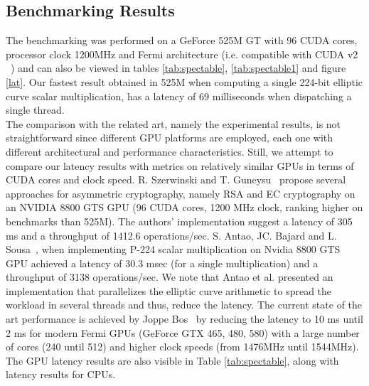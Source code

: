 \documentclass[11pt,twocolumn]{IEEEtran}
\begin{document}
\subsection{Benchmarking Results}\label{bench}
The benchmarking was performed on a GeForce 525M GT with 96 CUDA cores, processor clock 1200MHz and Fermi architecture (i.e. compatible with CUDA v2 ~\cite{cardspecs}) and can also be viewed in tables \ref{tab:spectable}, \ref{tab:spectable1} and figure \ref{lat}. Our fastest result obtained in 525M  when computing a single 224-bit elliptic curve scalar multiplication, has a latency of 69 milliseconds when dispatching a single thread. \\
The comparison with the related art, namely the experimental results, is not straightforward since different GPU platforms are employed, each one with different architectural and performance characteristics. Still, we attempt to compare our latency results with metrics on relatively similar GPUs in terms of CUDA cores and clock speed. R. Szerwinski and T. Guneysu~\cite{iambetterthanthem} propose several approaches for asymmetric cryptography, namely RSA and EC cryptography on an NVIDIA 8800 GTS GPU (96 CUDA cores, 1200 MHz clock, ranking higher on benchmarks than 525M). The authors' implementation suggest a latency of 305 ms and a throughput of 1412.6  operations/sec. S. Antao, JC. Bajard and L. Sousa~\cite{antao}, when implementing P-224 scalar multiplication on Nvidia 8800 GTS GPU achieved a latency of 30.3 msec (for a single multiplication) and a throughput of 3138 operations/sec. We note that Antao et al. presented an implementation that parallelizes the elliptic curve arithmetic to spread the workload in several threads and thus, reduce the latency. The current state of the art performance is achieved by Joppe Bos~\cite{bos} by reducing the latency to 10 ms until 2 ms for modern Fermi GPUs (GeForce GTX 465, 480, 580) with a large number of cores (240 until 512) and higher clock speeds (from 1476MHz until 1544MHz). The GPU latency results are also visible in Table \ref{tab:spectable}, along with latency results for CPUs.\\ 
\end{document}
